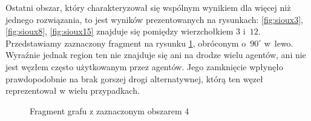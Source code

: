 \documentclass[twoside,12pt]{report}
\begin{document}
Ostatni obszar, który charakteryzował się wspólnym wynikiem dla więcej niż jednego rozwiązania, to jest wyników prezentowanych na rysunkach: \ref{fig:sioux3}, \ref{fig:sioux8}, \ref{fig:sioux15} znajduje się pomiędzy wierzchołkiem $3$ i~$12$. Przedstawiamy zaznaczony fragment na rysunku \ref{fig:frag_4}, obróconym o~$90^{\circ}$ w~lewo. Wyraźnie jednak region ten nie znajduje się ani na drodze wielu agentów, ani nie jest węzłem często użytkowanym przez agentów. Jego zamknięcie wpłynęło prawdopodobnie na brak gorszej drogi alternatywnej, którą ten węzeł reprezentował w wielu przypadkach.

\begin{figure}[htbp]
\centering
{}
\caption{Fragment grafu z zaznaczonym obszarem 4}
\label{fig:frag_4}
\end{figure}
\end{document}
